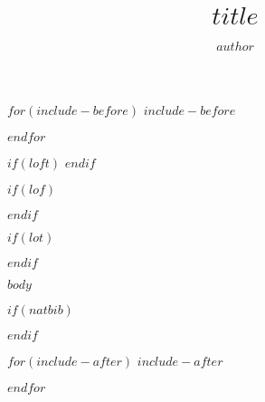 \documentclass[11pt, oneside]{extreport}
\title{$title$}
\author{$author$}
\begin{document}
\maketitle
{}

$for(include-before)$
$include-before$

$endfor$


\cleardoublepage

\tableofcontents
{}

$if(loft)$
\clearpage
$endif$

$if(lof)$
\listoffigures
{}
\vspace{34pt}
$endif$

$if(lot)$
\listoftables
{}
$endif$

\cleardoublepage



$body$

$if(natbib)$
\cleardoublepage


$endif$

$for(include-after)$
$include-after$

$endfor$
\end{document}
